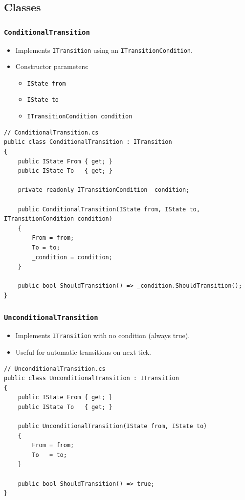 \subsection{Classes}

\subsubsection{\texttt{ConditionalTransition}}
\begin{itemize}
  \item Implements \texttt{ITransition} using an \texttt{ITransitionCondition}.
  \item Constructor parameters:
    \begin{itemize}
      \item \verb|IState from|  
      \item \verb|IState to|  
      \item \verb|ITransitionCondition condition|
    \end{itemize}
\end{itemize}

\begin{verbatim}
// ConditionalTransition.cs
public class ConditionalTransition : ITransition
{
    public IState From { get; }
    public IState To   { get; }

    private readonly ITransitionCondition _condition;

    public ConditionalTransition(IState from, IState to, ITransitionCondition condition)
    {
        From = from;
        To = to;
        _condition = condition;
    }

    public bool ShouldTransition() => _condition.ShouldTransition();
}
\end{verbatim}

\subsubsection{\texttt{UnconditionalTransition}}
\begin{itemize}
  \item Implements \texttt{ITransition} with no condition (always true).
  \item Useful for automatic transitions on next tick.
\end{itemize}

\begin{verbatim}
// UnconditionalTransition.cs
public class UnconditionalTransition : ITransition
{
    public IState From { get; }
    public IState To   { get; }

    public UnconditionalTransition(IState from, IState to)
    {
        From = from;
        To   = to;
    }

    public bool ShouldTransition() => true;
}
\end{verbatim}

